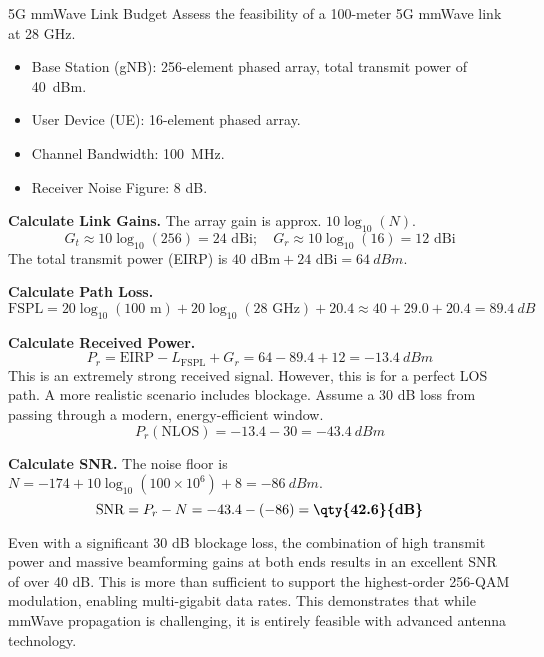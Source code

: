 \begin{workedexample}{5G mmWave Link Budget}
     Assess the feasibility of a 100-meter 5G mmWave link at 28 GHz.
    \begin{itemize}
        \item Base Station (gNB): 256-element phased array, total transmit power of \qty{40}{dBm}.
        \item User Device (UE): 16-element phased array.
        \item Channel Bandwidth: \qty{100}{MHz}.
        \item Receiver Noise Figure: 8 dB.
    \end{itemize}
    \begin{derivationsteps}
        \step \textbf{Calculate Link Gains.} The array gain is approx. $10\log_{10}(N)$.
        \[ G_t \approx 10\log_{10}(256) = 24 \text{ dBi}; \quad G_r \approx 10\log_{10}(16) = 12 \text{ dBi} \]
        The total transmit power (EIRP) is $40 \text{ dBm} + 24 \text{ dBi} = \qty{64}{dBm}$.

        \step \textbf{Calculate Path Loss.}
        \[ \text{FSPL} = 20\log_{10}(100 \text{ m}) + 20\log_{10}(28 \text{ GHz}) + 20.4 \approx 40 + 29.0 + 20.4 = \qty{89.4}{dB} \]

        \step \textbf{Calculate Received Power.}
        \[ P_r = \text{EIRP} - L_{\text{FSPL}} + G_r = 64 - 89.4 + 12 = \qty{-13.4}{dBm} \]
        This is an extremely strong received signal. However, this is for a perfect LOS path. A more realistic scenario includes blockage. Assume a 30 dB loss from passing through a modern, energy-efficient window.
        \[ P_r (\text{NLOS}) = -13.4 - 30 = \qty{-43.4}{dBm} \]

        \step \textbf{Calculate SNR.} The noise floor is $N = -174 + 10\log_{10}(100 \times 10^6) + 8 = \qty{-86}{dBm}$.
        \[ \text{SNR} = P_r - N = -43.4 - (-86) = \textbf{\qty{42.6}{dB}} \]
    \end{derivationsteps}
     Even with a significant 30 dB blockage loss, the combination of high transmit power and massive beamforming gains at both ends results in an excellent SNR of over 40 dB. This is more than sufficient to support the highest-order 256-QAM modulation, enabling multi-gigabit data rates. This demonstrates that while mmWave propagation is challenging, it is entirely feasible with advanced antenna technology.
\end{workedexample}

